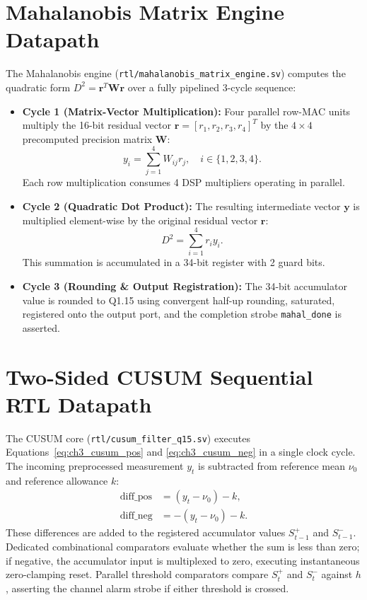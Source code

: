 \documentclass[11pt,a4paper]{report}
\begin{document}
\section{Mahalanobis Matrix Engine Datapath}
The Mahalanobis engine (\texttt{rtl/mahalanobis\_matrix\_engine.sv}) computes the quadratic form
$D^2 = \boldsymbol{r}^T \boldsymbol{W} \boldsymbol{r}$ over a fully pipelined 3-cycle sequence:
\begin{itemize}
    \item \textbf{Cycle 1 (Matrix-Vector Multiplication):} Four parallel row-MAC units multiply
    the 16-bit residual vector $\boldsymbol{r} = [r_1, r_2, r_3, r_4]^T$ by the $4 \times 4$
    precomputed precision matrix $\boldsymbol{W}$:
    \begin{equation}
    y_i = \sum_{j=1}^4 W_{ij} r_j, \quad i \in \{1, 2, 3, 4\}.
    \end{equation}
    Each row multiplication consumes 4 DSP multipliers operating in parallel.
    \item \textbf{Cycle 2 (Quadratic Dot Product):} The resulting intermediate vector $\boldsymbol{y}$
    is multiplied element-wise by the original residual vector $\boldsymbol{r}$:
    \begin{equation}
    D^2 = \sum_{i=1}^4 r_i y_i.
    \end{equation}
    This summation is accumulated in a 34-bit register with 2 guard bits.
    \item \textbf{Cycle 3 (Rounding \& Output Registration):} The 34-bit accumulator value is
    rounded to Q1.15 using convergent half-up rounding, saturated, registered onto the output
    port, and the completion strobe \texttt{mahal\_done} is asserted.
\end{itemize}

\section{Two-Sided CUSUM Sequential RTL Datapath}
The CUSUM core (\texttt{rtl/cusum\_filter\_q15.sv}) executes Equations~\eqref{eq:ch3_cusum_pos} and
\eqref{eq:ch3_cusum_neg} in a single clock cycle. The incoming preprocessed measurement $y_t$
is subtracted from reference mean $\nu_0$ and reference allowance $k$:
\begin{align}
\text{diff\_pos} &= (y_t - \nu_0) - k, \\
\text{diff\_neg} &= -(y_t - \nu_0) - k.
\end{align}
These differences are added to the registered accumulator values $S_{t-1}^+$ and $S_{t-1}^-$.
Dedicated combinational comparators evaluate whether the sum is less than zero; if negative,
the accumulator input is multiplexed to zero, executing instantaneous zero-clamping reset.
Parallel threshold comparators compare $S_t^+$ and $S_t^-$ against $h$, asserting the channel
alarm strobe if either threshold is crossed.
\end{document}
